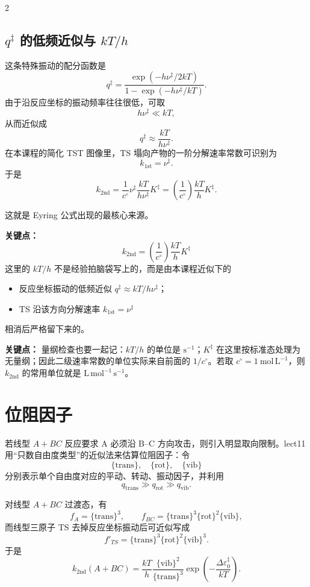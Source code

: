 \documentclass[a4paper,9pt]{article}
\newenvironment{keypoint}
{\par\vspace{0.3em}\noindent\begin{tcolorbox}[colback=keybg,colframe=keycolor,boxrule=0.5pt,arc=2pt,left=2pt,right=2pt,top=2pt,bottom=2pt,boxsep=0pt]\noindent\textcolor{keycolor}{\textbf{关键点：}}}
{\end{tcolorbox}\par\vspace{0.3em}}
\begin{document}
\begin{multicols}{2}
\subsection{$q^{\ddagger}$ 的低频近似与 $kT/h$}
这条特殊振动的配分函数是
\[
q^{\ddagger}=\frac{\exp(-h\nu^{\ddagger}/2kT)}{1-\exp(-h\nu^{\ddagger}/kT)}.
\]
由于沿反应坐标的振动频率往往很低，可取
\[
h\nu^{\ddagger}\ll kT,
\]
从而近似成
\[
q^{\ddagger}\approx \frac{kT}{h\nu^{\ddagger}}.
\]
在本课程的简化 TST 图像里，TS 塌向产物的一阶分解速率常数可识别为
\[
k_{1\mathrm{st}}=\nu^{\ddagger}.
\]
于是
\[
k_{2\mathrm{nd}}=\frac{1}{c^\circ}\nu^{\ddagger}\frac{kT}{h\nu^{\ddagger}}K^{\ddagger}
=\left(\frac{1}{c^\circ}\right)\frac{kT}{h}K^{\ddagger}.
\]

这就是 Eyring 公式出现的最核心来源。

\begin{keypoint}
\[
k_{2\mathrm{nd}}=\left(\frac{1}{c^\circ}\right)\frac{kT}{h}K^{\ddagger}
\]
这里的 $kT/h$ 不是经验拍脑袋写上的，而是由本课程近似下的
\begin{itemize}
  \item 反应坐标振动的低频近似 $q^{\ddagger}\approx kT/h\nu^{\ddagger}$；
  \item TS 沿该方向分解速率 $k_{1\mathrm{st}}=\nu^{\ddagger}$
\end{itemize}
相消后严格留下来的。
\end{keypoint}

\begin{keypoint}
	量纲检查也要一起记：$kT/h$ 的单位是 $\mathrm{s^{-1}}$；$K^{\ddagger}$ 在这里按标准态处理为无量纲；因此二级速率常数的单位实际来自前面的 $1/c^\circ$。若取 $c^\circ=1\ \mathrm{mol\,L^{-1}}$，则 $k_{2\mathrm{nd}}$ 的常用单位就是 $\mathrm{L\,mol^{-1}\,s^{-1}}$。
\end{keypoint}

\section{位阻因子}

若线型 $A+BC$ 反应要求 A 必须沿 B--C 方向攻击，则引入明显取向限制。lect11 用“只数自由度类型”的近似法来估算位阻因子：令
\[
\{\mathrm{trans}\},\quad \{\mathrm{rot}\},\quad \{\mathrm{vib}\}
\]
分别表示单个自由度对应的平动、转动、振动因子，并利用
\[
q_{\mathrm{trans}}\gg q_{\mathrm{rot}}\gg q_{\mathrm{vib}}.
\]

对线型 $A+BC$ 过渡态，有
\[
f_A=\{\mathrm{trans}\}^3,
\qquad
f_{BC}=\{\mathrm{trans}\}^3\{\mathrm{rot}\}^2\{\mathrm{vib}\},
\]
而线型三原子 TS 去掉反应坐标振动后可近似写成
\[
f'_{TS}=\{\mathrm{trans}\}^3\{\mathrm{rot}\}^2\{\mathrm{vib}\}^3.
\]
于是
\[
k_{2\mathrm{nd}}(A+BC)=\frac{kT}{h}
\frac{\{\mathrm{vib}\}^2}{\{\mathrm{trans}\}^3}
\exp\left(-\frac{\Delta\varepsilon_0^{\ddagger}}{kT}\right).
\]


\end{multicols}
\end{document}
